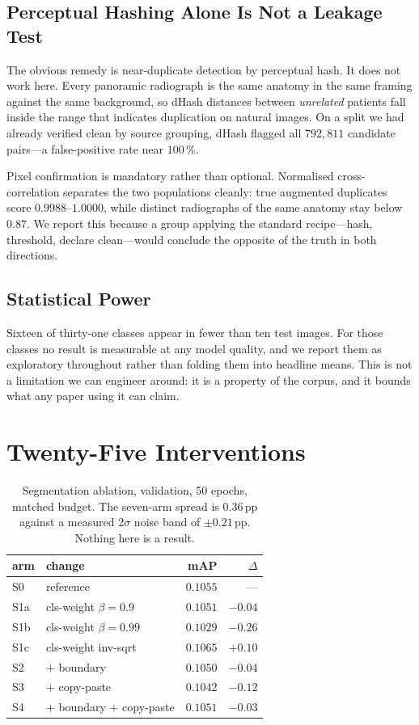 \documentclass[10pt,twocolumn,letterpaper]{article}
\begin{document}
\subsection{Perceptual Hashing Alone Is Not a Leakage Test}

The obvious remedy is near-duplicate detection by perceptual hash. It does not
work here. Every panoramic radiograph is the same anatomy in the same framing
against the same background, so dHash distances between \emph{unrelated} patients
fall inside the range that indicates duplication on natural images. On a split we
had already verified clean by source grouping, dHash flagged all $792{,}811$
candidate pairs---a false-positive rate near $100$\,\%.

Pixel confirmation is mandatory rather than optional. Normalised cross-correlation
separates the two populations cleanly: true augmented duplicates score
$0.9988$--$1.0000$, while distinct radiographs of the same anatomy stay below
$0.87$. We report this because a group applying the standard recipe---hash,
threshold, declare clean---would conclude the opposite of the truth in both
directions.

\subsection{Statistical Power}

Sixteen of thirty-one classes appear in fewer than ten test images. For those
classes no result is measurable at any model quality, and we report them as
exploratory throughout rather than folding them into headline means. This is not
a limitation we can engineer around: it is a property of the corpus, and it
bounds what any paper using it can claim.

\section{Twenty-Five Interventions}
\label{sec:interventions}

\begin{table}[t]\centering\small
\begin{tabular}{llrr}
\toprule
arm & change & mAP & $\Delta$ \\
\midrule
S0 & reference & $0.1055$ & --- \\
S1a & cls-weight $\beta{=}0.9$ & $0.1051$ & $-0.04$ \\
S1b & cls-weight $\beta{=}0.99$ & $0.1029$ & $-0.26$ \\
S1c & cls-weight inv-sqrt & $0.1065$ & $+0.10$ \\
S2 & $+$ boundary & $0.1050$ & $-0.04$ \\
S3 & $+$ copy-paste & $0.1042$ & $-0.12$ \\
S4 & $+$ boundary $+$ copy-paste & $0.1051$ & $-0.03$ \\
\bottomrule
\end{tabular}
\caption{Segmentation ablation, validation, 50 epochs, matched budget. The
seven-arm spread is $0.36$\,pp against a measured $2\sigma$ noise band of
$\pm0.21$\,pp. Nothing here is a result.}
\label{tab:segabl}
\end{table}
\end{document}
